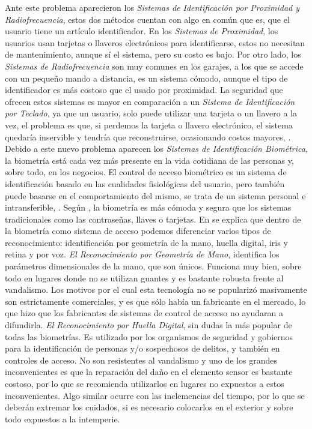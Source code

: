 \vskip 0.5cm
Ante este problema aparecieron los \textit{Sistemas de Identificación por Proximidad y Radiofrecuencia}, estos dos métodos cuentan con algo en común que es, que el usuario tiene un artículo identificador. En los \textit{Sistemas de Proximidad}, los usuarios usan tarjetas o llaveros electrónicos para identificarse, estos no necesitan de mantenimiento, aunque sí el sistema, pero su costo es bajo. Por otro lado, los \textit{Sistemas de Radiofrecuencia} son muy comunes en los garajes, a los que se accede con un pequeño mando a distancia, es un sistema cómodo, aunque el tipo de identificador es más costoso que el usado por proximidad. La seguridad que ofrecen estos sistemas es mayor en comparación a un \textit{Sistema de Identificación por Teclado}, ya que un usuario, solo puede utilizar una tarjeta o un llavero a la vez, el problema es que, si perdemos la tarjeta o llavero electrónico, el sistema quedaría inservible y tendría que reconstruirse, ocasionando costos mayores, \cite{fermax}.
\vskip 0.5cm
Debido a este nuevo problema aparecen los \textit{Sistemas de Identificación Biométrica}, la biometría está cada vez más presente en la vida cotidiana de las personas y, sobre todo, en los negocios. El control de acceso biométrico es un sistema de identificación basado en las cualidades fisiológicas del usuario, pero también puede basarse en el comportamiento del mismo, se trata de un sistema personal e intransferible, \cite{fermax}. Según \citep{hugo}, la biometría es más cómoda y segura que los sistemas tradicionales como las contraseñas, llaves o tarjetas.
\vskip 0.5cm
En \citep{cosentino} se explica que dentro de la biometría como sistema de acceso podemos diferenciar varios tipos de reconocimiento: identificación por geometría de la mano, huella digital, iris y retina y por voz.
\vskip 0.5cm
\textit{El Reconocimiento por Geometría de Mano}, identifica los parámetros dimensionales de la mano, que son únicos. Funciona muy bien, sobre todo en lugares donde no se utilizan guantes y es bastante robusta frente al vandalismo. Los motivos por el cual esta tecnología no se popularizó masivamente son estrictamente comerciales, y es que sólo había un fabricante en el mercado, lo que hizo que los fabricantes de sistemas de control de acceso no ayudaran a difundirla.
\vskip 0.5cm
\textit{El Reconocimiento por Huella Digital}, sin dudas la más popular de todas las biometrías. Es utilizado por los organismos de seguridad y gobiernos para la identificación de personas y/o sospechosos de delitos, y también en controles de acceso. No son resistentes al vandalismo y uno de los grandes inconvenientes es que la reparación del daño en el elemento sensor es bastante costoso, por lo que se recomienda utilizarlos en lugares no expuestos a estos inconvenientes. Algo similar ocurre con las inclemencias del tiempo, por lo que se deberán extremar los cuidados, si es necesario colocarlos en el exterior y sobre todo expuestos a la intemperie.
